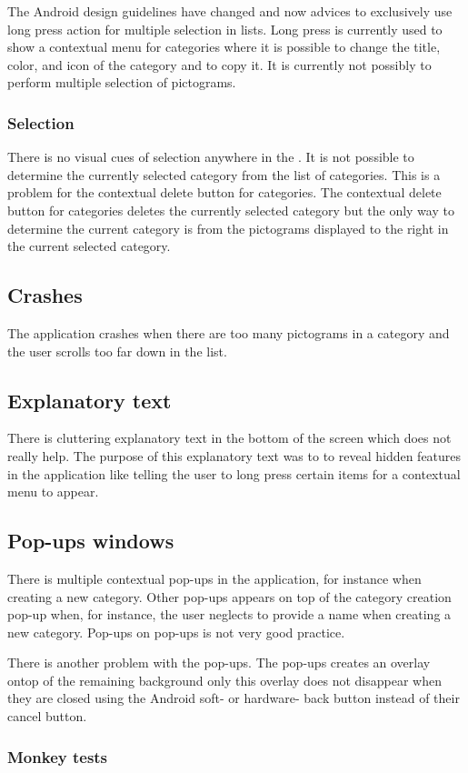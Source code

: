 The Android design guidelines have changed and now advices to exclusively use long press action for multiple selection in lists. Long press is currently used to show a contextual menu for categories where it is possible to change the title, color, and icon of the category and to copy it. It is currently not possibly to perform multiple selection of pictograms. 

\subsubsection{Selection}

There is no visual cues of selection anywhere in the \ct. It is not possible to determine the currently selected category from the list of categories. This is a problem for the contextual delete button for categories. The contextual delete button for categories deletes the currently selected category but the only way to determine the current category is from the pictograms displayed to the right in the current selected category. 

\subsection{Crashes}

The application crashes when there are too many pictograms in a category and the user scrolls too far down in the list. 

\subsection{Explanatory text}

There is cluttering explanatory text in the bottom of the screen which does not really help. The purpose of this explanatory text was to to reveal hidden features in the application like telling the user to long press certain items for a contextual menu to appear. 

\subsection{Pop-ups windows}

There is multiple contextual pop-ups in the application, for instance when creating a new category. Other pop-ups appears on top of the category creation pop-up when, for instance, the user neglects to provide a name when creating a new category. Pop-ups on pop-ups is not very good practice.  

There is another problem with the pop-ups. The pop-ups creates an overlay ontop of the remaining background only this overlay does not disappear when they are closed using the Android soft- or hardware- back button instead of their cancel button. 
 
\subsubsection{Monkey tests}

